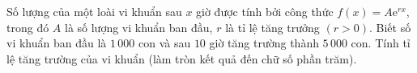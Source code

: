 \begin{bt}%
	Số lượng của một loài vi khuẩn sau $x$ giờ được tính bởi công thức $f(x)=A\mathrm{e}^{rx}$, trong đó
	$A$ là số lượng vi khuẩn ban đầu, $r$ là tỉ lệ tăng trưởng $(r>0)$. Biết số vi khuẩn ban đầu là $1\,000$
	con và sau $10$ giờ tăng trường thành $5\,000$ con. Tính tỉ lệ tăng trường của vi khuẩn (làm tròn kết quả đến
	chữ số phần trăm).
\end{bt}

